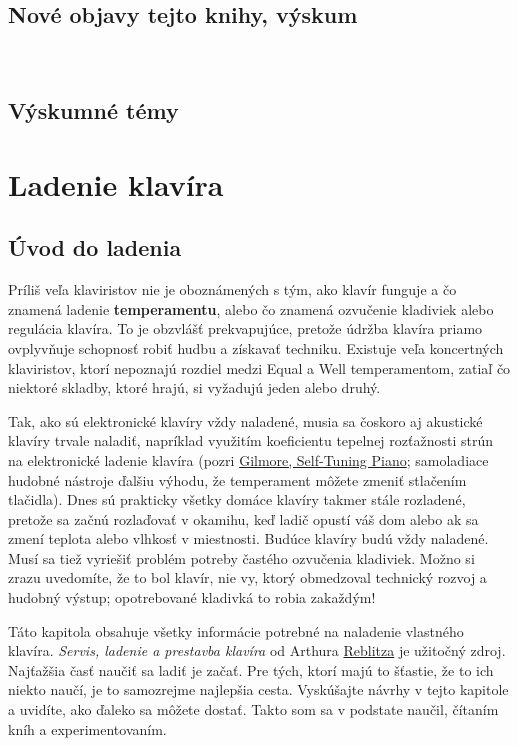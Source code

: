 \documentclass[11pt,a4paper]{book}
\begin{document}
\section{Nové objavy tejto knihy, výskum}\label{s:new-discoveries}
\ 
\section{Výskumné témy}\label{s:research-topics}


\chapter{Ladenie klavíra}\label{s:piano-tuning}

\section{Úvod do ladenia}\label{s:introduction-tuning}
Príliš veľa klaviristov nie je oboznámených s tým, ako klavír funguje a čo znamená ladenie \textbf{temperamentu}, alebo čo znamená ozvučenie kladiviek alebo regulácia klavíra. To je obzvlášť prekvapujúce, pretože údržba klavíra priamo ovplyvňuje schopnosť robiť hudbu a získavať techniku. Existuje veľa koncertných klaviristov, ktorí nepoznajú rozdiel medzi Equal a Well temperamentom, zatiaľ čo niektoré skladby, ktoré hrajú, si vyžadujú jeden alebo druhý.

Tak, ako sú elektronické klavíry vždy naladené, musia sa čoskoro aj akustické klavíry trvale naladiť, napríklad využitím koeficientu tepelnej rozťažnosti strún na elektronické ladenie klavíra (pozri \hyperlink{r:gilmore}{Gilmore, Self-Tuning Piano}; samoladiace hudobné nástroje ďalšiu výhodu, že temperament môžete zmeniť stlačením tlačidla). Dnes sú prakticky všetky domáce klavíry takmer stále rozladené, pretože sa začnú rozlaďovať v okamihu, keď ladič opustí váš dom alebo ak sa zmení teplota alebo vlhkosť v miestnosti. Budúce klavíry budú vždy naladené. Musí sa tiež vyriešiť problém potreby častého ozvučenia kladiviek. Možno si zrazu uvedomíte, že to bol klavír, nie vy, ktorý obmedzoval technický rozvoj a hudobný výstup; opotrebované kladivká to robia zakaždým!

Táto kapitola obsahuje všetky informácie potrebné na naladenie vlastného klavíra. \textit{Servis, ladenie a prestavba klavíra} od Arthura \hyperlink{r:reblitz}{Reblitza} je užitočný zdroj. Najťažšia časť naučiť sa ladiť je začať. Pre tých, ktorí majú to šťastie, že to ich niekto naučí, je to samozrejme najlepšia cesta. Vyskúšajte návrhy v tejto kapitole a uvidíte, ako ďaleko sa môžete dostať. Takto som sa v podstate naučil, čítaním kníh a experimentovaním.
\end{document}
